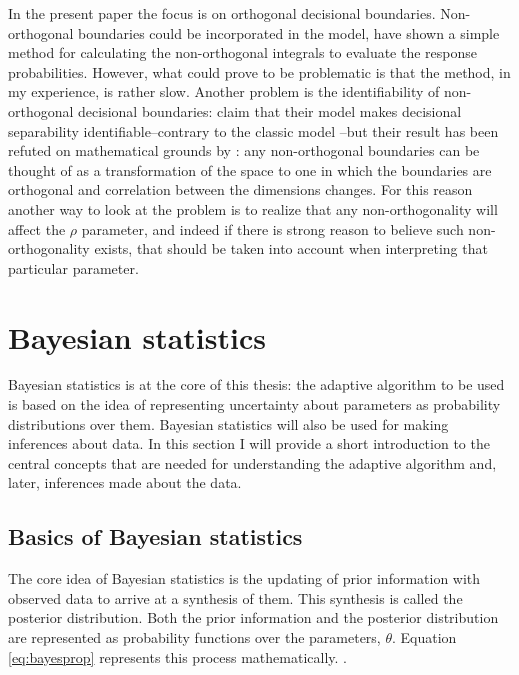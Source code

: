 \documentclass{article}\usepackage{knitr}
\begin{document}
In the present paper the focus is on orthogonal decisional boundaries. Non-orthogonal boundaries could be incorporated in the model, \cite{ennis2003} have shown a simple method for calculating the non-orthogonal integrals to evaluate the response probabilities. However, what could prove to be problematic is that the method, in my experience, is rather slow.  Another problem is the identifiability of non-orthogonal decisional boundaries: \cite{soto2015} claim that their model makes decisional separability identifiable--contrary to the classic model \citep{silbert2013}--but their result has been refuted on mathematical grounds by \cite{silbert2016}: any non-orthogonal boundaries can be thought of as a transformation of the space to one in which the boundaries are orthogonal and correlation between the dimensions changes. For this reason another way to look at the problem is to realize that any non-orthogonality will affect the $\rho$ parameter, and indeed if there is strong reason to believe such non-orthogonality exists, that should be taken into account when interpreting that particular parameter.  


\newpage


\section{Bayesian statistics}
\label{sec:bayes}

Bayesian statistics is at the core of this thesis: the adaptive algorithm to be used is based on the idea of representing uncertainty about parameters as probability distributions over them. Bayesian statistics will also be used for making inferences about data. In this section I will provide a short introduction to the central concepts that are needed for understanding the adaptive algorithm and, later, inferences made about the data. 

\subsection{Basics of Bayesian statistics}

The core idea of Bayesian statistics is the updating of prior information with observed data to arrive at a synthesis of them. This synthesis is called the posterior distribution. Both the prior information and the posterior distribution are represented as probability functions over the parameters, $\theta$. Equation \ref{eq:bayesprop} represents this process mathematically. \citep{kruschke2015}.
\end{document}
